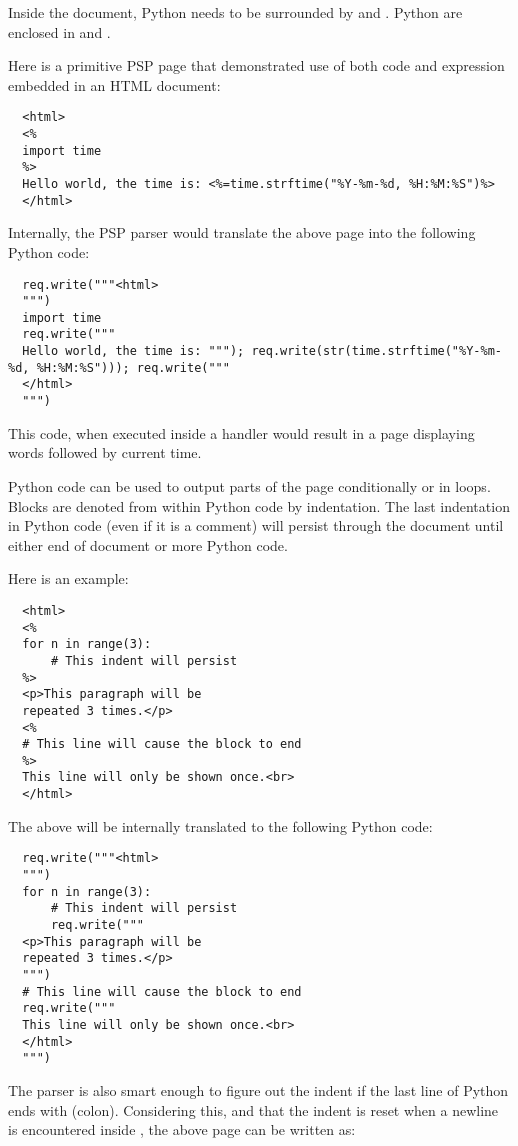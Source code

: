 Inside the document, Python  needs to be surrounded by
\samp{<\%} and \samp{\%>}. Python  are enclosed in
\samp{<\%=} and \samp{\%>}.

Here is a primitive PSP page that demonstrated use of both code and
expression embedded in an HTML document:

\begin{verbatim}
  <html>
  <%
  import time
  %>
  Hello world, the time is: <%=time.strftime("%Y-%m-%d, %H:%M:%S")%>
  </html>
\end{verbatim}

Internally, the PSP parser would translate the above page into the
following Python code:

\begin{verbatim}
  req.write("""<html>
  """)
  import time
  req.write("""
  Hello world, the time is: """); req.write(str(time.strftime("%Y-%m-%d, %H:%M:%S"))); req.write("""
  </html>
  """)
\end{verbatim}

This code, when executed inside a handler would result in a page
displaying words  followed by current time.

Python code can be used to output parts of the page conditionally or
in loops. Blocks are denoted from within Python code by
indentation. The last indentation in Python code (even if it is a
comment) will persist through the document until either end of
document or more Python code.

Here is an example:
\begin{verbatim}
  <html>
  <%
  for n in range(3):
      # This indent will persist
  %>
  <p>This paragraph will be 
  repeated 3 times.</p>
  <%
  # This line will cause the block to end
  %>
  This line will only be shown once.<br>
  </html>
\end{verbatim}

The above will be internally translated to the following Python code:

\begin{verbatim}
  req.write("""<html>
  """)
  for n in range(3):
      # This indent will persist
      req.write("""
  <p>This paragraph will be
  repeated 3 times.</p>
  """)
  # This line will cause the block to end
  req.write("""
  This line will only be shown once.<br>
  </html>
  """)
\end{verbatim}

The parser is also smart enough to figure out the indent if the last
line of Python ends with \samp{:} (colon). Considering this, and that the
indent is reset when a newline is encountered inside \samp{<\% \%>}, the
above page can be written as:

